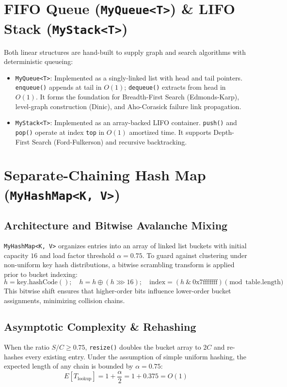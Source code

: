 \section{FIFO Queue (\texttt{MyQueue<T>}) \& LIFO Stack (\texttt{MyStack<T>})}
Both linear structures are hand-built to supply graph and search algorithms with deterministic queueing:
\begin{itemize}
    \item \texttt{MyQueue<T>}: Implemented as a singly-linked list with head and tail pointers. \texttt{enqueue()} appends at tail in $O(1)$; \texttt{dequeue()} extracts from head in $O(1)$. It forms the foundation for Breadth-First Search (Edmonds-Karp), level-graph construction (Dinic), and Aho-Corasick failure link propagation.
    \item \texttt{MyStack<T>}: Implemented as an array-backed LIFO container. \texttt{push()} and \texttt{pop()} operate at index \texttt{top} in $O(1)$ amortized time. It supports Depth-First Search (Ford-Fulkerson) and recursive backtracking.
\end{itemize}

\section{Separate-Chaining Hash Map (\texttt{MyHashMap<K, V>})}
\subsection{Architecture and Bitwise Avalanche Mixing}
\texttt{MyHashMap<K, V>} organizes entries into an array of linked list buckets with initial capacity $16$ and load factor threshold $\alpha = 0.75$.
To guard against clustering under non-uniform key hash distributions, a bitwise scrambling transform is applied prior to bucket indexing:
\begin{equation}
h = \text{key.hashCode}(); \quad h = h \oplus (h \ggg 16); \quad \text{index} = (h \ \& \ \text{0x7fffffff}) \pmod{\text{table.length}}
\end{equation}
This bitwise shift ensures that higher-order bits influence lower-order bucket assignments, minimizing collision chains.

\subsection{Asymptotic Complexity \& Rehashing}
When the ratio $S / C \ge 0.75$, \texttt{resize()} doubles the bucket array to $2C$ and re-hashes every existing entry. Under the assumption of simple uniform hashing, the expected length of any chain is bounded by $\alpha = 0.75$:
\begin{equation}
E[T_{\text{lookup}}] = 1 + \frac{\alpha}{2} = 1 + 0.375 = O(1)
\end{equation}

